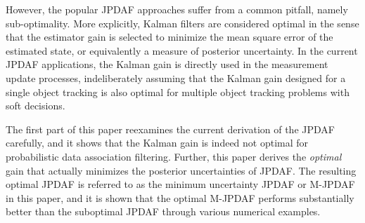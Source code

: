 
However, the popular JPDAF approaches suffer from a common pitfall, namely sub-optimality.
More explicitly, Kalman filters are considered optimal in the sense that the estimator gain is selected to minimize the mean square error of the estimated state, or equivalently a measure of posterior uncertainty.
In the current JPDAF applications, the Kalman gain is directly used in the measurement update processes, indeliberately assuming that the Kalman gain designed for a single object tracking is also optimal for multiple object tracking problems with soft decisions.



The first part of this paper reexamines the current derivation of the JPDAF carefully, and it shows that the Kalman gain is indeed not optimal for probabilistic data association filtering. Further, this paper derives the \textit{optimal} gain that actually minimizes the posterior uncertainties of JPDAF.  
The resulting optimal JPDAF is referred to as the minimum uncertainty JPDAF or M-JPDAF in this paper, and it is shown that the optimal M-JPDAF performs substantially better than the suboptimal JPDAF through various numerical examples.

